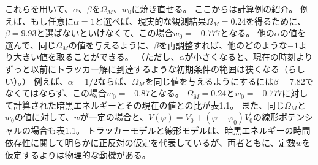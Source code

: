 \documentclass[11pt]{ltjsarticle}
\theoremstyle{plain}
\theoremstyle{break}
\begin{document}
これらを用いて、$\alpha、\beta$を$\Omega_{M}、w_0$に焼き直せる。
ここからは計算例の紹介。
例えば、もし任意に$\alpha = 1$と選べば、現実的な観測結果$\Omega_{M} = 0.24$を得るために、$\beta = 9.93$と選ばないといけなくて、この場合$w_0 = -0.777$となる。
他の$\alpha$の値を選んで、同じ$\Omega_{M}$の値を与えるように、$\beta$を再調整すれば、他のどのような$-1$より大きい値を取ることができる。
（ただし、$\alpha$が小さくなると、現在の時刻よりずっと以前にトラッカー解に到達するような初期条件の範囲は狭くなる（らしい）。）
例えば、$\alpha = 1/2$ならば、$\Omega_{M}$を同じ値を与えるようにするには$\beta = 7.82$でなくてはならず、この場合$w_0 = -0.87$となる。
$\Omega_M = 0.24$と$w_0 = -0.777$に対して計算された暗黒エネルギーとその現在の値との比が表1.1。
また、同じ$\Omega_{M}$と$w_0$の値に対して、$w$が一定の場合と、$V(\varphi)=V_{0}+\left(\varphi-\varphi_{0}\right) V_{0}^{\prime}$の線形ポテンシャルの場合も表1.1。
トラッカーモデルと線形モデルは、暗黒エネルギーの時間依存性に関して明らかに正反対の仮定を代表しているが、両者ともに、定数$w$を仮定するよりは物理的な動機がある。
\end{document}
